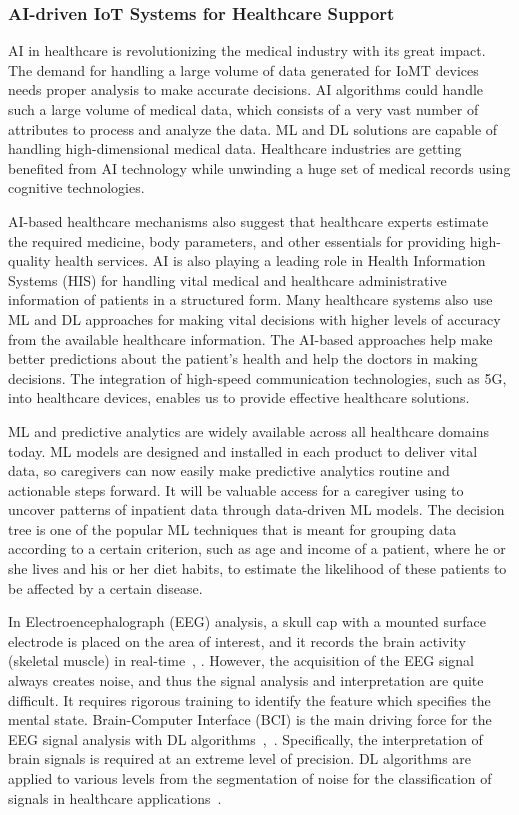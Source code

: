 \documentclass[journal]{IEEEtran}
\begin{document}
\subsubsection{AI-driven IoT Systems for Healthcare Support}
AI in healthcare is revolutionizing the medical industry with its great impact. The demand for handling a large volume of data generated for IoMT devices needs proper analysis to make accurate decisions. AI algorithms could handle such a large volume of medical data, which consists of a very vast number of attributes to process and analyze the data. ML and DL solutions are capable of handling high-dimensional medical data. Healthcare industries are getting benefited from AI technology while unwinding a huge set of medical records using cognitive technologies. 

AI-based healthcare mechanisms also suggest that healthcare experts estimate the required medicine, body parameters, and other essentials for providing high-quality health services. AI is also playing a leading role in Health Information Systems (HIS) for handling vital medical and healthcare administrative information of patients in a structured form. Many healthcare systems also use ML and DL approaches for making vital decisions with higher levels of accuracy from the available healthcare information. The AI-based approaches help make better predictions about the patient's health and help the doctors in making decisions. The integration of high-speed communication technologies, such as 5G, into healthcare devices, enables us to provide effective healthcare solutions. 

ML and predictive analytics are widely available across all healthcare domains today. ML models are designed and installed in each product to deliver vital data, so caregivers can now easily make predictive analytics routine and actionable steps forward. It will be valuable access for a caregiver using to uncover patterns of inpatient data through data-driven ML models. The decision tree is one of the popular ML techniques that is meant for grouping data according to a certain criterion, such as age and income of a patient, where he or she lives and his or her diet habits, to estimate the likelihood of these patients to be affected by a certain disease.

In Electroencephalograph (EEG) analysis, a skull cap with a mounted surface electrode is placed on the area of interest, and it records the brain activity (skeletal muscle) in real-time~\cite{liu_recent_2014}, \cite{chen_new_2017}. However, the acquisition of the EEG signal always creates noise, and thus the signal analysis and interpretation are quite difficult. It requires rigorous training to identify the feature which specifies the mental state. Brain-Computer Interface (BCI) is the main driving force for the EEG signal analysis with DL algorithms~\cite{jung_removal_2000},~\cite{schlogl_fully_2007}. Specifically, the interpretation of brain signals is required at an extreme level of precision. DL algorithms are applied to various levels from the segmentation of noise for the classification of signals in healthcare applications~\cite{moretti_computerized_2003}. 
\end{document}
